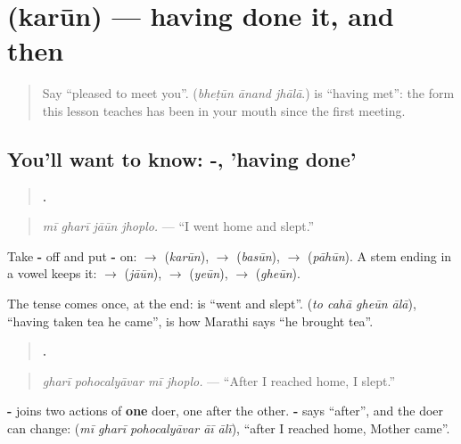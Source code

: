 \section[\texorpdfstring{\mr{करून} (karūn)}{करून (karūn)}]{ (karūn) — having done it, and then}

\label{lesson:MR-C279-karun}



\begin{quote}
Say \textquotedblleft{}pleased to meet you\textquotedblright{}. (\emph{bheṭūn ānand jhālā}.) \textbf{} is \textquotedblleft{}having met\textquotedblright{}: the form this lesson teaches has been in your mouth since the first meeting.
\end{quote}

\subsection*{You'll want to know: -, 'having done'}
\begin{quote}
\textbf{   .}
\end{quote}

\begin{quote}
\emph{mī gharī jāūn jhoplo.} — \textquotedblleft{}I went home and slept.\textquotedblright{}
\end{quote}

Take \textbf{-} off and put \textbf{-} on: \textbf{} $\to$ \textbf{} (\emph{karūn}), \textbf{} $\to$ \textbf{} (\emph{basūn}), \textbf{} $\to$ \textbf{} (\emph{pāhūn}). A stem ending in a vowel keeps it: \textbf{} $\to$ \textbf{} (\emph{jāūn}), \textbf{} $\to$ \textbf{} (\emph{yeūn}), \textbf{} $\to$ \textbf{} (\emph{gheūn}).

The tense comes once, at the end: \textbf{ } is \textquotedblleft{}went and slept\textquotedblright{}. \textbf{   } (\emph{to cahā gheūn ālā}), \textquotedblleft{}having taken tea he came\textquotedblright{}, is how Marathi says \textquotedblleft{}he brought tea\textquotedblright{}.

\begin{grammarlens}[title={Grammar Lens: -\mr{ऊन} or -\mr{ल्यावर}}]
\begin{quote}
\textbf{   .}
\end{quote}

\begin{quote}
\emph{gharī pohocalyāvar mī jhoplo.} — \textquotedblleft{}After I reached home, I slept.\textquotedblright{}
\end{quote}

\textbf{-} joins two actions of \textbf{one} doer, one after the other. \textbf{-} says \textquotedblleft{}after\textquotedblright{}, and the doer can change: \textbf{    } (\emph{mī gharī pohocalyāvar āī ālī}), \textquotedblleft{}after I reached home, Mother came\textquotedblright{}.
\end{grammarlens}

